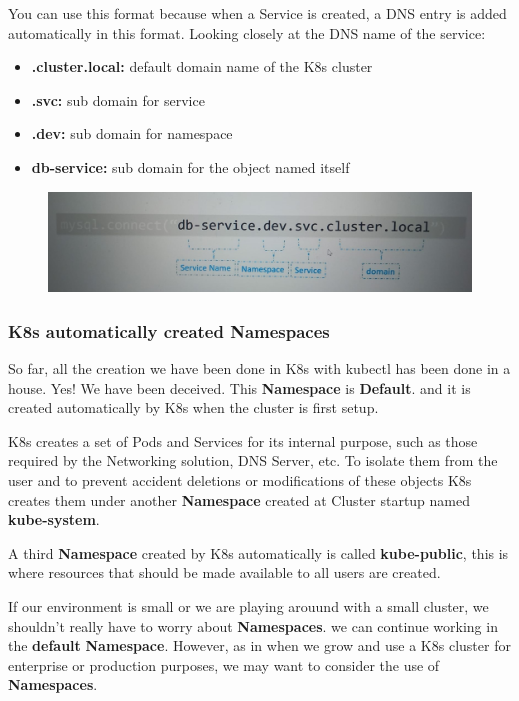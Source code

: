 \documentclass{article}
\begin{document}
You can use this format because when a Service is created, a DNS entry is added automatically in this format. Looking closely at the DNS name of the service:
\begin{itemize}
    \item \textbf{.cluster.local:} default domain name of the K8s cluster
    \item \textbf{.svc:} sub domain for service
    \item \textbf{.dev:} sub domain for namespace
    \item \textbf{db-service:} sub domain for the object named itself
\end{itemize}

\begin{figure}[H]
    \centering
    \includegraphics[scale=0.3]{pictures/namespace4.jpeg}
\end{figure}

\subsubsection{K8s automatically created Namespaces}

So far, all the creation we have been done in K8s with kubectl has been done in a house. Yes! We have been deceived. This \textbf{Namespace} is \textbf{Default}. and it is created automatically by K8s when the cluster is first setup. 

K8s creates a set of Pods and Services for its internal purpose, such as those required by the Networking solution, DNS Server, etc. To isolate them from the user and to prevent accident deletions or modifications of these objects K8s creates them under another \textbf{Namespace} created at Cluster startup named \textbf{kube-system}.

A third \textbf{Namespace} created by K8s automatically is called \textbf{kube-public}, this is where resources that should be made available to all users are created.

If our environment is small or we are playing arouund with a small cluster, we shouldn't really have to worry about \textbf{Namespaces}. we can continue working in the \textbf{default} \textbf{Namespace}. However, as in when we grow and use a K8s cluster for enterprise or production purposes, we may want to consider the use of \textbf{Namespaces}.
\end{document}
